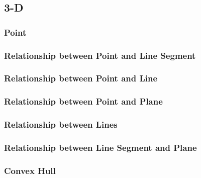 \subsection{3-D} %

\subsubsection{Point} %


\subsubsection{Relationship between Point and Line Segment} %


\subsubsection{Relationship between Point and Line} %


\subsubsection{Relationship between Point and Plane} %


\subsubsection{Relationship between Lines} %


\subsubsection{Relationship between Line Segment and Plane} %


\subsubsection{Convex Hull} %


